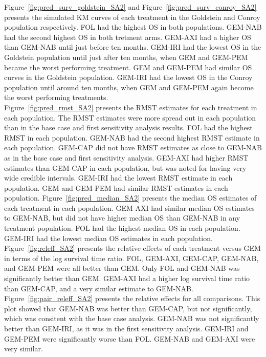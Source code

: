 Figure~\ref{fig:pred_surv_goldstein_SA2} and Figure~\ref{fig:pred_surv_conroy_SA2} presents the simulated KM curves of each treatment in the Goldstein and Conroy population respectively. FOL had the highest OS in both populations. GEM-NAB had the second highest OS in both tretment arms. GEM-AXI had a higher OS than GEM-NAB until just before ten months. GEM-IRI had the lowest OS in the Goldstein population until just after ten months, when GEM and GEM-PEM became the worst performing treatment. GEM and GEM-PEM had similar OS curves in the Goldstein population. GEM-IRI had the lowest OS in the Conroy population until around ten months, when GEM and GEM-PEM again become the worst performing treatments. \\

Figure~\ref{fig:pred_rmst_SA2} presents the RMST estimates for each treatment in each population. The RMST estimates were more spread out in each population than in the base case and first sensitivity analysis results. FOL had the highest RMST in each population. GEM-NAB had the second highest RMST estimate in each population. GEM-CAP did not have RMST estimates as close to GEM-NAB as in the base case and first sensitivity analysis. GEM-AXI had higher RMST estimates than GEM-CAP in each population, but was noted for having very wide credible intervals. GEM-IRI had the lowest RMST estimate in each population. GEM and GEM-PEM had similar RMST estimates in each population. Figure~\ref{fig:pred_median_SA2} presents the median OS estimates of each treatment in each population. GEM-AXI had similar median OS estimates to GEM-NAB, but did not have higher median OS than GEM-NAB in any treatment population. FOL had the highest median OS in each population. GEM-IRI had the lowest median OS estimates in each population. \\

Figure~\ref{fig:releff_SA2} presents the relative effects of each treatment versus GEM in terms of the log survival time ratio. FOL, GEM-AXI, GEM-CAP, GEM-NAB, and GEM-PEM were all better than GEM. Only FOL and GEM-NAB was significantly better than GEM. GEM-AXI had a higher log survival time ratio than GEM-CAP, and a very similar estimate to GEM-NAB. Figure~\ref{fig:pair_releff_SA2} presents the relative effects for all comparisons. This plot showed that GEM-NAB was better than GEM-CAP, but not significantly, which was consitent with the base case analysis. GEM-NAB was not significantly better than GEM-IRI, as it was in the first sensitivity analysis. GEM-IRI and GEM-PEM were significantly worse than FOL. GEM-NAB and GEM-AXI were very similar. \\

